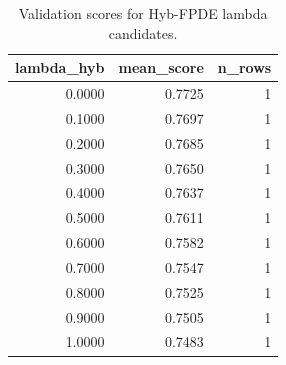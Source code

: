 \begin{table}[t]
\caption{Validation scores for Hyb-FPDE lambda candidates.}
\label{tab:lambda_distribution_computed}
\centering
\begin{tabular}{rrr}
\toprule
lambda\_hyb & mean\_score & n\_rows \\
\midrule
0.0000 & 0.7725 & 1 \\
0.1000 & 0.7697 & 1 \\
0.2000 & 0.7685 & 1 \\
0.3000 & 0.7650 & 1 \\
0.4000 & 0.7637 & 1 \\
0.5000 & 0.7611 & 1 \\
0.6000 & 0.7582 & 1 \\
0.7000 & 0.7547 & 1 \\
0.8000 & 0.7525 & 1 \\
0.9000 & 0.7505 & 1 \\
1.0000 & 0.7483 & 1 \\
\bottomrule
\end{tabular}

\end{table}
